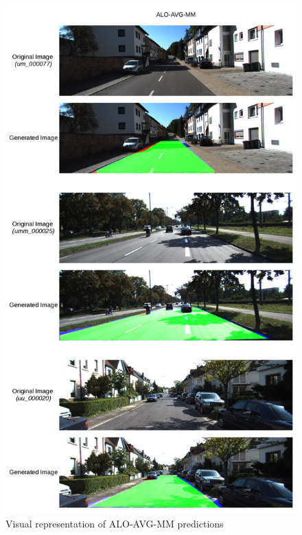 \begin{figure}
  \centering
  \includegraphics[width=1\columnwidth]{../imagens/ilustracoes/cap6_kitti_visual_representation.png} %
  \caption{Visual representation of ALO-AVG-MM predictions}
  \label{fig:kitti_representacao_visual}
\end{figure}
